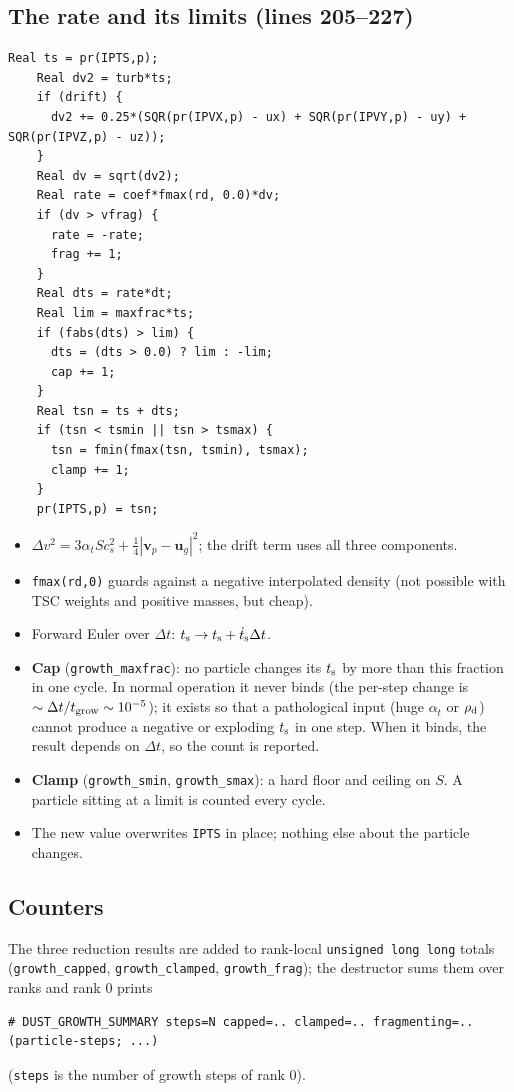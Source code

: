\documentclass[11pt]{article}
\newcommand{\code}[1]{\texttt{#1}}
\newcommand{\St}{S}
\newcommand{\ts}{t_{\rm s}}
\newcommand{\rhod}{\rho_{\rm d}}
\begin{document}
\subsection{The rate and its limits (lines 205--227)}
\begin{lstlisting}[firstnumber=205]
    Real ts = pr(IPTS,p);
    Real dv2 = turb*ts;
    if (drift) {
      dv2 += 0.25*(SQR(pr(IPVX,p) - ux) + SQR(pr(IPVY,p) - uy) + SQR(pr(IPVZ,p) - uz));
    }
    Real dv = sqrt(dv2);
    Real rate = coef*fmax(rd, 0.0)*dv;
    if (dv > vfrag) {
      rate = -rate;
      frag += 1;
    }
    Real dts = rate*dt;
    Real lim = maxfrac*ts;
    if (fabs(dts) > lim) {
      dts = (dts > 0.0) ? lim : -lim;
      cap += 1;
    }
    Real tsn = ts + dts;
    if (tsn < tsmin || tsn > tsmax) {
      tsn = fmin(fmax(tsn, tsmin), tsmax);
      clamp += 1;
    }
    pr(IPTS,p) = tsn;
\end{lstlisting}
\begin{itemize}
\item $\Delta v^2=3\alpha_t\St c_s^2+\frac14|\mathbf v_p-\mathbf u_g|^2$; the drift
  term uses all three components.
\item \code{fmax(rd,0)} guards against a negative interpolated density (not possible
  with TSC weights and positive masses, but cheap).
\item Forward Euler over $\Delta t$: $\ts\to\ts+\dot\ts\Delta t$.
\item \textbf{Cap} (\code{growth\_maxfrac}): no particle changes its $\ts$ by more than
  this fraction in one cycle. In normal operation it never binds (the per-step change
  is $\sim\Delta t/t_{\rm grow}\sim10^{-5}$); it exists so that a pathological input
  (huge $\alpha_t$ or $\rhod$) cannot produce a negative or exploding $\ts$ in one step.
  When it binds, the result depends on $\Delta t$, so the count is reported.
\item \textbf{Clamp} (\code{growth\_smin}, \code{growth\_smax}): a hard floor and
  ceiling on $\St$. A particle sitting at a limit is counted every cycle.
\item The new value overwrites \code{IPTS} in place; nothing else about the particle
  changes.
\end{itemize}

\subsection{Counters}
The three reduction results are added to rank-local \code{unsigned long long} totals
(\code{growth\_capped}, \code{growth\_clamped}, \code{growth\_frag}); the destructor
sums them over ranks and rank 0 prints
\begin{lstlisting}[numbers=none]
# DUST_GROWTH_SUMMARY steps=N capped=.. clamped=.. fragmenting=.. (particle-steps; ...)
\end{lstlisting}
(\code{steps} is the number of growth steps of rank 0).
\end{document}
